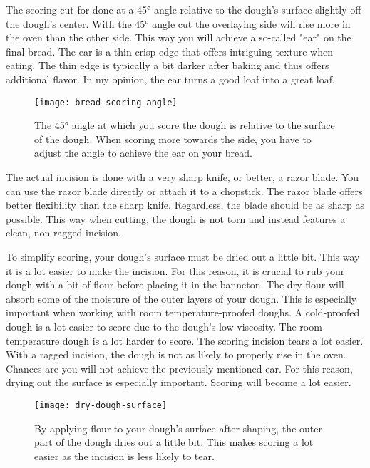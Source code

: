 The scoring cut for done at a 45° angle relative to the dough's
surface slightly off the dough's center. With the 45° angle cut
the overlaying side will rise more in the oven than the other side.
This way you will achieve a so-called "ear" on the final bread.
The ear is a thin crisp edge that offers intriguing texture
when eating. The thin edge is typically a bit darker after baking
and thus offers additional flavor. In my opinion, the ear turns
a good loaf into a great loaf.

\begin{figure}[htb!]
  \texttt{[image: bread-scoring-angle]}
  \caption{The 45° angle at which you score the dough is relative to the surface of the dough.
  When scoring more towards the side, you have to adjust the angle to achieve the ear on your
  bread.}
  \label{fig:scoring-angle}
\end{figure}

The actual incision is done with a very sharp knife, or better, a razor
blade. You can use the razor blade directly or attach it to a chopstick.
The razor blade offers better flexibility than the sharp knife.
Regardless, the blade should be as sharp as possible. This way when cutting,
the dough is not torn and instead features a clean, non ragged incision.

To simplify scoring, your dough's surface must be dried out a little bit.
This way it is a lot easier to make the incision.
For this reason, it is crucial to rub your dough with a bit of flour
before placing it in the banneton. The dry flour will absorb some of the
moisture of the outer layers of your dough. This is especially important
when working with room temperature-proofed doughs. A cold-proofed dough
is a lot easier to score due to the dough's low viscosity. The room-temperature
dough is a lot harder to score. The scoring incision tears a lot
easier. With a ragged incision, the dough is not as likely to properly
rise in the oven. Chances are you will not achieve the previously mentioned
ear. For this reason, drying out the surface is especially important. Scoring
will become a lot easier.

\begin{figure}[htb!]
  \texttt{[image: dry-dough-surface]}
  \caption{By applying flour to your dough's surface after shaping, the outer part
  of the dough dries out a little bit. This makes scoring a lot easier as the incision
  is less likely to tear.}
  \label{fig:dried-out-dough-scoring}
\end{figure}


